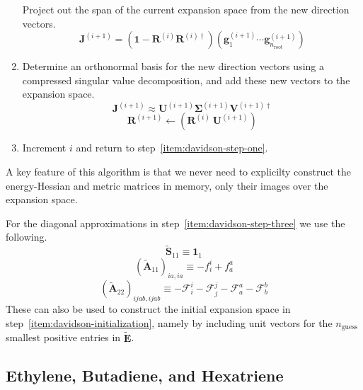 \begin{enumerate}
        Project out the span of the current expansion space from the new
        direction vectors.
        \[
            \mathbf{J}^{(i+1)}
            =
            (\mathbf{1} - \mathbf{R}^{(i)}\mathbf{R}^{(i)\dagger})
            (\mathbf{g}_1^{(i+1)}\cdots \mathbf{g}_{n_\mathrm{root}}^{(i+1)})
        \]
    \item
        Determine an orthonormal basis for the new direction vectors using a
        compressed singular value decomposition, and add these new vectors to
        the expansion space.
        \[
            \mathbf{J}^{(i+1)}
            \approx
            \mathbf{U}^{(i+1)}
            \boldsymbol\Sigma^{(i+1)}
            \mathbf{V}^{(i+1)\dagger}
        \]
        \[
            \mathbf{R}^{(i+1)}
            \leftarrow
            (\mathbf{R}^{(i)}\ \mathbf{U}^{(i+1)})
        \]
    \item
        Increment \(i\) and return to step~\ref{item:davidson-step-one}.
\end{enumerate}
A key feature of this algorithm is that we never need to explicilty construct
the energy-Hessian and metric matrices in memory, only their images over the
expansion space.

For the diagonal approximations in step~\ref{item:davidson-step-three} we use
the following.
\[
    \tilde{\mathbf{S}}_{11}
    \equiv
    \mathbf{1}_1
\]
\[
    (\tilde{\mathbf{A}}_{11})_{ia,ia}
    \equiv
    -
    f_i^i
    +
    f_a^a
\]
\[
    (\tilde{\mathbf{A}}_{22})_{ijab,ijab}
    \equiv
    -
    \mathcal{F}_i^i
    -
    \mathcal{F}_j^j
    -
    \mathcal{F}_a^a
    -
    \mathcal{F}_b^b
\]
These can also be used to construct the initial expansion space in
step~\ref{item:davidson-initialization}, namely by including unit vectors for
the \(n_\mathrm{guess}\) smallest positive entries in \(\tilde{\mathbf{E}}\).


\subsection{Ethylene, Butadiene, and Hexatriene}
\label{sec:alkenes}

